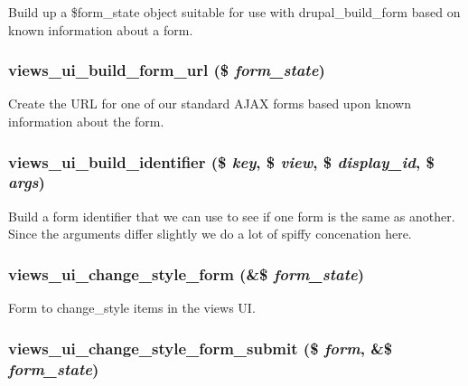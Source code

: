 Build up a \$form\_\-state object suitable for use with drupal\_\-build\_\-form based on known information about a form. \hypertarget{admin_8inc_89ecd86607b4c1d1928120aaa1004c0d}{
\subsubsection[{views\_\-ui\_\-build\_\-form\_\-url}]{\setlength{\rightskip}{0pt plus 5cm}views\_\-ui\_\-build\_\-form\_\-url (\$ {\em form\_\-state})}}
\label{admin_8inc_89ecd86607b4c1d1928120aaa1004c0d}


Create the URL for one of our standard AJAX forms based upon known information about the form. \hypertarget{admin_8inc_70be38405376cc28c9f3c53643ae8581}{
\subsubsection[{views\_\-ui\_\-build\_\-identifier}]{\setlength{\rightskip}{0pt plus 5cm}views\_\-ui\_\-build\_\-identifier (\$ {\em key}, \/  \$ {\em view}, \/  \$ {\em display\_\-id}, \/  \$ {\em args})}}
\label{admin_8inc_70be38405376cc28c9f3c53643ae8581}


Build a form identifier that we can use to see if one form is the same as another. Since the arguments differ slightly we do a lot of spiffy concenation here. \hypertarget{admin_8inc_a94927cb8215f90a8b01211dae1e426f}{
\subsubsection[{views\_\-ui\_\-change\_\-style\_\-form}]{\setlength{\rightskip}{0pt plus 5cm}views\_\-ui\_\-change\_\-style\_\-form (\&\$ {\em form\_\-state})}}
\label{admin_8inc_a94927cb8215f90a8b01211dae1e426f}


Form to change\_\-style items in the views UI. \hypertarget{admin_8inc_f49405357d3cc5d22218ec2831c5dd71}{
\subsubsection[{views\_\-ui\_\-change\_\-style\_\-form\_\-submit}]{\setlength{\rightskip}{0pt plus 5cm}views\_\-ui\_\-change\_\-style\_\-form\_\-submit (\$ {\em form}, \/  \&\$ {\em form\_\-state})}}
\label{admin_8inc_f49405357d3cc5d22218ec2831c5dd71}


